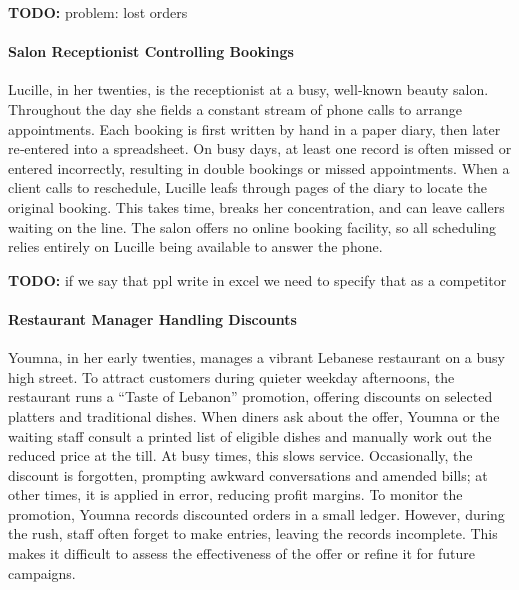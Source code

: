 \documentclass[]{VUMIFTemplateClass}
\newcommand{\todocomment}[1]{%
    \begin{tcolorbox}[colback=red!20, colframe=red!60, arc=0pt, outer arc=0pt, boxrule=1pt, left=3pt, right=3pt, top=3pt, bottom=3pt]
        \textbf{\textcolor{orange!70!black}{TODO:}} #1
    \end{tcolorbox}
}
\newcommand{\subsubsubsection}[1]{\paragraph{#1}}
\begin{document}
\todocomment{problem: lost orders}




\subsubsubsection{Salon Receptionist Controlling Bookings}

Lucille, in her twenties, is the receptionist at a busy, well‑known beauty
salon. Throughout the day she fields a constant stream of phone calls to arrange
appointments. Each booking is first written by hand in a paper diary, then later
re‑entered into a spreadsheet. On busy days, at least one record is often missed
or entered incorrectly, resulting in double bookings or missed appointments.
When a client calls to reschedule, Lucille leafs through pages of the diary to
locate the original booking. This takes time, breaks her concentration, and can
leave callers waiting on the line. The salon offers no online booking facility,
so all scheduling relies entirely on Lucille being available to answer the
phone.

\todocomment{if we say that ppl write in excel we need to specify that as a competitor}


\subsubsubsection{Restaurant Manager Handling Discounts}


Youmna, in her early twenties, manages a vibrant Lebanese restaurant on a busy
high street. To attract customers during quieter weekday afternoons, the
restaurant runs a “Taste of Lebanon” promotion, offering discounts on selected
platters and traditional dishes. When diners ask about the offer, Youmna or the
waiting staff consult a printed list of eligible dishes and manually work out
the reduced price at the till. At busy times, this slows service. Occasionally,
the discount is forgotten, prompting awkward conversations and amended bills; at
other times, it is applied in error, reducing profit margins. To monitor the
promotion, Youmna records discounted orders in a small ledger. However, during
the rush, staff often forget to make entries, leaving the records incomplete.
This makes it difficult to assess the effectiveness of the offer or refine it
for future campaigns.
\end{document}
